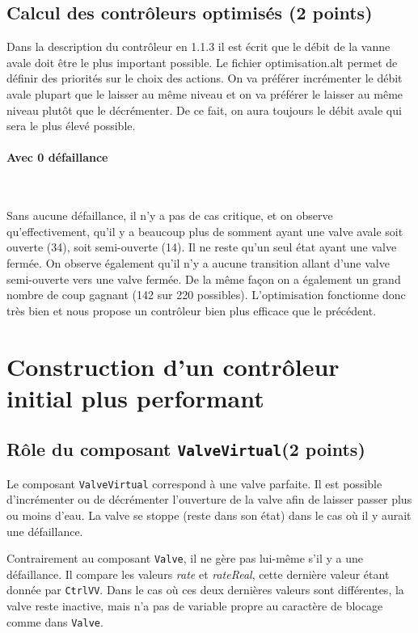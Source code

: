 \documentclass[a4paper]{book}
\begin{document}
\subsection{Calcul des contrôleurs optimisés (2 points)}

Dans la description du contrôleur en 1.1.3 il est écrit que le débit de la vanne avale doit être le plus important possible.
Le fichier optimisation.alt permet de définir des priorités sur le choix des actions. On va préférer incrémenter le débit avale 
plupart que le laisser au même niveau et on va préférer le laisser au même niveau plutôt que le décrémenter. De ce fait, on aura 
toujours le débit avale qui sera le plus élevé possible.
\paragraph{Avec 0 défaillance}\

Sans aucune défaillance, il n'y a pas de cas critique, et on observe qu'effectivement, qu'il 
y a beaucoup plus de somment ayant une valve avale soit ouverte (34), soit semi-ouverte (14). Il ne reste qu'un seul état
ayant une valve fermée. On observe également qu'il n'y a aucune transition allant d'une valve semi-ouverte vers une valve fermée.
De la même façon on a également un grand nombre de coup gagnant (142 sur 220 possibles).
L'optimisation fonctionne donc très bien et nous propose un contrôleur bien plus efficace que le précédent.
\section{Construction d'un contrôleur initial plus performant}
\subsection{Rôle du composant {\tt ValveVirtual}(2 points)}
Le composant {\tt ValveVirtual} correspond à une valve parfaite. Il est possible d'incrémenter ou de décrémenter l'ouverture 
de la valve afin de laisser passer plus ou moins d'eau. La valve se stoppe (reste dans son état) dans le cas où il y aurait une défaillance.

Contrairement au composant {\tt Valve}, il ne gère pas lui-même s'il y a une défaillance. Il compare les valeurs \textit{rate} et 
\textit{rateReal}, cette dernière valeur étant donnée par {\tt CtrlVV}. Dans le cas où ces deux dernières valeurs sont différentes, 
la valve reste inactive, mais n'a pas de variable propre au caractère de blocage comme dans {\tt Valve}.
\end{document}
